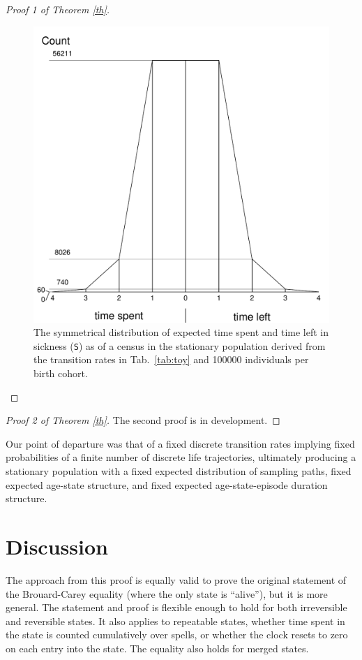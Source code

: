 \documentclass[12pt,oneside,a4paper]{article}
\theoremstyle{definition}
\newcommand{\vb}[1]{\texttt{#1}}
\begin{document}
\begin{proof}[Proof 1 of Theorem \ref{th}]
\begin{enumerate}
 \begin{figure}[h!]
\centering
\caption{The symmetrical distribution of expected time spent and time left in sickness (\vb{S}) as of a census in the stationary population derived from the transition rates in Tab.~\ref{tab:toy} and 100000 individuals per birth cohort.}
\label{fig:toydist}
\includegraphics[scale=.5]{Figures/ToyDist.pdf}
\end{figure}

\end{enumerate}
\FloatBarrier
\end{proof}

\begin{proof}[Proof 2 of Theorem \ref{th}]
The second proof is in development.
\end{proof}

Our point of departure was that of a fixed discrete transition rates implying fixed probabilities of a finite number of discrete life trajectories, ultimately producing a stationary population with a fixed expected distribution of sampling paths, fixed expected age-state structure, and fixed expected age-state-episode duration structure.

\section{Discussion}
The approach from this proof is equally valid to prove the
original statement of the Brouard-Carey equality (where the only state is ``alive''),
but it is more general.
The statement and proof is flexible enough to hold for both irreversible and reversible
states. It also applies to repeatable states, whether time spent in the
state is counted cumulatively over spells, or whether the clock resets to
zero on each entry into the state. The equality
also holds for merged states. 
\end{document}
